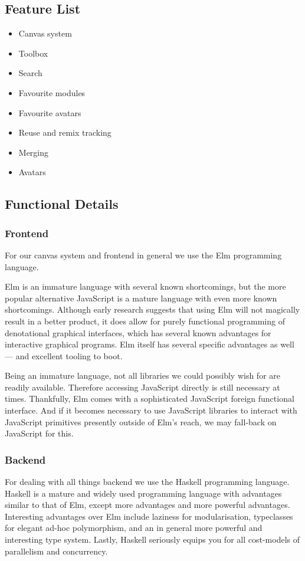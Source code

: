 \subsection{Feature List}
\begin{itemize}
\item Canvas system
\item Toolbox
\item Search
\item Favourite modules
\item Favourite avatars
\item Reuse and remix tracking
\item Merging
\item Avatars
\end{itemize}

\subsection{Functional Details}
\subsubsection{Frontend}
For our canvas system and frontend in general we use the Elm programming 
language\cite{czaplicki2012elm}.

Elm is an immature language with several known 
shortcomings\cite{smitsextreme}, but the more popular alternative JavaScript 
is a mature language with even more known 
shortcomings\cite{flanagan2006javascript}. Although early research suggests 
that using Elm will not magically result in a better 
product\cite{buist2014extending}, it does allow for purely functional 
programming of denotational graphical interfaces\cite{czaplicki2012elm}, which 
has several known advantages for interactive graphical 
programs\cite{berntsen2014quest}. Elm itself has several specific advantages 
as well --- and excellent tooling to boot\cite{kraeutmann2015functional}.

Being an immature language, not all libraries we could possibly wish for are 
readily available. Therefore accessing JavaScript directly is still necessary 
at times. Thankfully, Elm comes with a sophisticated JavaScript foreign 
functional interface\cite{elmports}. And if it becomes necessary to use 
JavaScript libraries to interact with JavaScript primitives presently outside 
of Elm's reach, we may fall-back on JavaScript for this.

\subsubsection{Backend}
For dealing with all things backend we use the Haskell programming 
language\cite{marlow2010haskell}. Haskell is a mature and widely used 
programming language with advantages similar to that of Elm, except more 
advantages and more powerful advantages. Interesting advantages over Elm 
include laziness for modularisation\cite{hughes1989functional}, typeclasses 
for elegant ad-hoc polymorphism\cite{wadler1989make}, and an in general more 
powerful and interesting type system\cite{jones2003wearing}. Lastly, Haskell 
seriously equips you for all cost-models of parallelism and 
concurrency\cite{jones2012future}.

